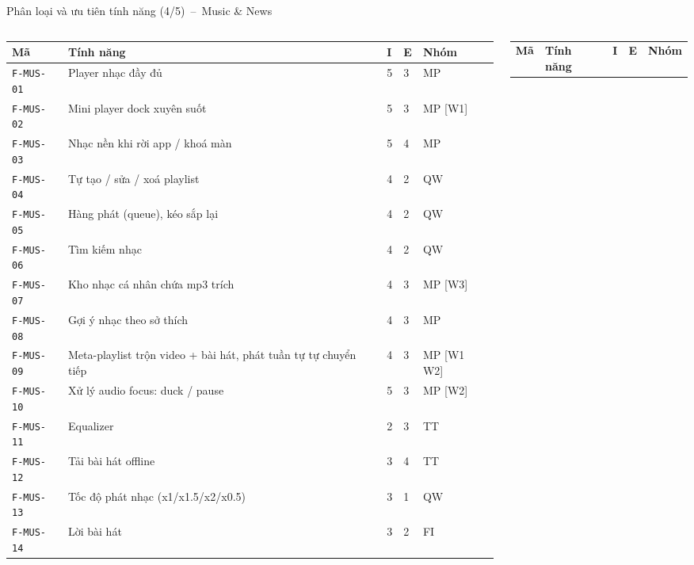 \documentclass[aspectratio=169]{beamer}
\begin{document}
\begin{frame}{Phân loại và ưu tiên tính năng (4/5)~--~Music \& News}
  \begin{columns}
    \begin{column}{0.48\textwidth}\begin{center}\tiny\setlength{\tabcolsep}{1.5pt}
\begin{tabular}{@{}p{1.35cm}p{3.2cm}p{0.22cm}p{0.22cm}p{1.15cm}@{}}
\toprule
\textbf{Mã} & \textbf{Tính năng} & \textbf{I} & \textbf{E} & \textbf{Nhóm} \\
\midrule
\texttt{F-MUS-01} & Player nhạc đầy đủ & 5 & 3 & MP \\
\texttt{F-MUS-02} & Mini player dock xuyên suốt & 5 & 3 & MP [W1] \\
\texttt{F-MUS-03} & Nhạc nền khi rời app / khoá màn & 5 & 4 & MP \\
\texttt{F-MUS-04} & Tự tạo / sửa / xoá playlist & 4 & 2 & QW \\
\texttt{F-MUS-05} & Hàng phát (queue), kéo sắp lại & 4 & 2 & QW \\
\texttt{F-MUS-06} & Tìm kiếm nhạc & 4 & 2 & QW \\
\texttt{F-MUS-07} & Kho nhạc cá nhân chứa mp3 trích & 4 & 3 & MP [W3] \\
\texttt{F-MUS-08} & Gợi ý nhạc theo sở thích & 4 & 3 & MP \\
\texttt{F-MUS-09} & Meta-playlist trộn video + bài hát, phát tuần tự tự chuyển tiếp & 4 & 3 & MP [W1 W2] \\
\texttt{F-MUS-10} & Xử lý audio focus: duck / pause & 5 & 3 & MP [W2] \\
\texttt{F-MUS-11} & Equalizer & 2 & 3 & TT \\
\texttt{F-MUS-12} & Tải bài hát offline & 3 & 4 & TT \\
\texttt{F-MUS-13} & Tốc độ phát nhạc (x1/x1.5/x2/x0.5) & 3 & 1 & QW \\
\texttt{F-MUS-14} & Lời bài hát & 3 & 2 & FI \\
\bottomrule
\end{tabular}
    \end{center}\end{column}
    \begin{column}{0.48\textwidth}\begin{center}\tiny\setlength{\tabcolsep}{1.5pt}
\begin{tabular}{@{}p{1.35cm}p{3.2cm}p{0.22cm}p{0.22cm}p{1.15cm}@{}}
\toprule
\textbf{Mã} & \textbf{Tính năng} & \textbf{I} & \textbf{E} & \textbf{Nhóm} \\

\end{tabular}
\end{center}
\end{column}
\end{columns}
\end{frame}
\end{document}
